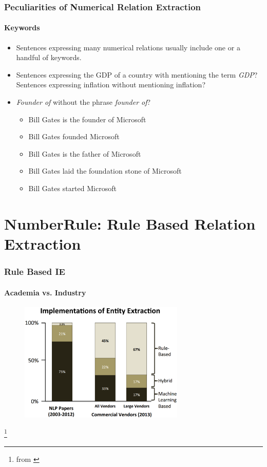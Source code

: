 \documentclass{beamer}
\begin{document}
\begin{frame}
\frametitle{Peculiarities of Numerical Relation Extraction}
\framesubtitle{Keywords}

\begin{itemize}
\setlength \itemsep{1em}
\item Sentences expressing many numerical relations usually include one or a handful of keywords.
\item Sentences expressing the GDP of a country with mentioning the term \textit{GDP}? Sentences expressing inflation without mentioning inflation?
\item \textit{Founder of} without the phrase \textit{founder of}?
\begin{itemize}
\item Bill Gates is the founder of Microsoft
\item Bill Gates founded Microsoft
\item Bill Gates is the father of Microsoft
\item Bill Gates laid the foundation stone of Microsoft
\item Bill Gates started Microsoft
\end{itemize}
\end{itemize}

\end{frame}


\section{NumberRule: Rule Based Relation Extraction}

\begin{frame}
\frametitle{Rule Based IE}
\framesubtitle{Academia vs. Industry}

\begin{figure}
\includegraphics[width=0.7\textwidth]{images/longliverulebased.eps}
\end{figure}

\footnote{from \cite{chiticariu2013rule}}

\end{frame}
\end{document}
